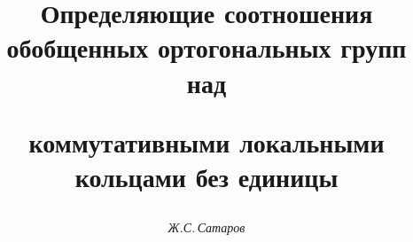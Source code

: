 

  




 


\newcommand{\simto}{\overset{\sim}{\to}{}} 


\newcommand{\isimto}{\overset{i\;}{{\simto}}{}} 


\newcommand{\la}{\langle} 


\newcommand{\ra}{\rangle} 


\newcommand{\id}{\operatorname{id}}  


\newcommand{\diag}{\operatorname{diag}} 


\newcommand{\sgn}{\operatorname{sgn}} 


\newcommand{\Det}{\operatorname{det}} 


\newcommand{\tts}[1]{}  


  




  


\setcounter{page}{24}  












  


\author{\it Ж.С.\,Сатаров}  




\title{Определяющие соотношения обобщенных ортогональных групп над 


коммутативными локальными кольцами без единицы} 


  


